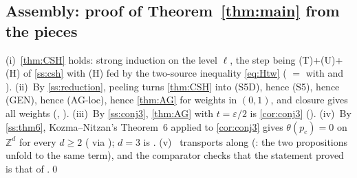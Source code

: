 \documentclass[11pt]{article}
\theoremstyle{definition}
\theoremstyle{remark}
\newcommand{\Zd}{\mathbb{Z}^d}
\newcommand{\pc}{p_{\mathrm c}}
\begin{document}
\subsection{Assembly: proof of Theorem~\ref{thm:main} from the pieces}\label{ss:assembly}
(i)~\cref{thm:CSH} holds: strong induction on the level $\ell$, the step being (T)+(U)+(H) of \cref{ss:csh} with (H) fed by the two-source
inequality \eqref{eq:Htw} ( $=$  with  and ).
(ii)~By \cref{ss:reduction}, peeling turns \cref{thm:CSH} into (S5D), hence (S5), hence (GEN), hence (AG-loc), hence \cref{thm:AG} for weights in
$(0,1)$, and closure gives all weights (, ).
(iii)~By \cref{ss:conj3}, \cref{thm:AG} with $t=\varepsilon/2$ is \cref{cor:conj3} ().
(iv)~By \cref{ss:thm6}, Kozma--Nitzan's Theorem~6 applied to \cref{cor:conj3} gives $\theta(\pc)=0$ on $\Zd$ for every $d\ge2$
( via ); $d=3$ is .
(v)~ transports  along  (: the two
 propositions unfold to the same term), and the comparator checks that the statement proved is that of
.\qed

\end{document}
